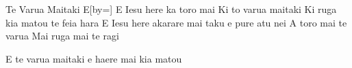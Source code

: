 \begin{song}{Te Varua Maitaki E}[by=]
\transpose{\shift}
\beginverse
E Iesu here ka toro mai
Ki to varua maitaki
Ki ruga kia matou te feia hara
E Iesu here akarare mai taku e pure atu nei
A toro mai te varua 
Mai ruga mai te ragi
\endverse

\beginchorus
E te varua maitaki e haere mai kia matou
\endchorus
\end{song}
